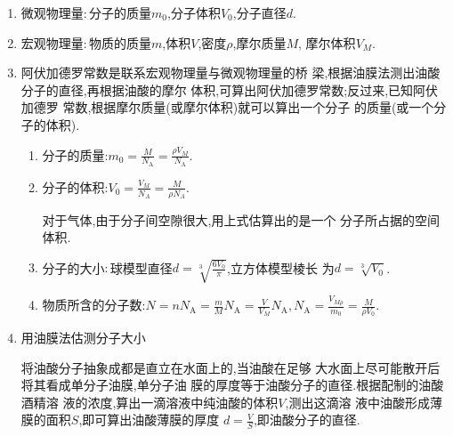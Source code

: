 \newpage
{}

\begin{enumerate}
\renewcommand{\labelenumi}{\arabic{enumi}.}
\item
微观物理量$ : $分子的质量$ m_{0} $,分子体积$ V_{0} $,分子直径$ d $.


\item
宏观物理量$ : $物质的质量$ m $,体积$ V $,密度$ \rho $,摩尔质量$ M $,
摩尔体积$ V_{M} $.


\item
阿伏加德罗常数是联系宏观物理量与微观物理量的桥
梁,根据油膜法测出油酸分子的直径,再根据油酸的摩尔
体积,可算出阿伏加德罗常数;反过来,已知阿伏加德罗
常数,根据摩尔质量(或摩尔体积)就可以算出一个分子
的质量(或一个分子的体积).
\begin{enumerate}
\renewcommand{\labelenumii}{(\arabic{enumii})}

\item 
分子的质量:$m _ { 0 } = \frac { M } { N _ { \mathrm { A } } } = \frac { \rho V _ { M } } { N _ { \mathrm { A } } }$.


\item 
分子的体积:$V _ { 0 } = \frac { V _ { M } } { N _ { A } } = \frac { M } { \rho N _ { A } }$.

对于气体,由于分子间空隙很大,用上式估算出的是一个
分子所占据的空间体积.


\item 
分子的大小$ : $球模型直径$d = \sqrt [ 3 ] { \frac { 6 V _ { 0 } } { \pi } }$,立方体模型棱长
为$d = \sqrt [ 3 ] { V _ { 0 } }$.

\item 
物质所含的分子数:$N = n N _ { \mathrm { A } } = \frac { m } { M } N _ { \mathrm { A } } = \frac { V } { V _ { M } } N _ { \mathrm { A } } , N _ { \mathrm { A } } =$$\frac { V _ { M \rho } } { m _ { 0 } } = \frac { M } { \rho V _ { 0 } }$.


\end{enumerate}


\item
用油膜法估测分子大小

将油酸分子抽象成都是直立在水面上的,当油酸在足够
大水面上尽可能散开后将其看成单分子油膜,单分子油
膜的厚度等于油酸分子的直径.根据配制的油酸酒精溶
液的浓度,算出一滴溶液中纯油酸的体积$ V $,测出这滴溶
液中油酸形成薄膜的面积$ S $,即可算出油酸薄膜的厚度
$ d=\frac{V}{S} $,即油酸分子的直径.


\end{enumerate}
